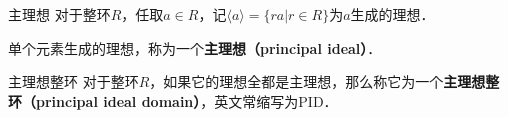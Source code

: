 
\begin{definition}{主理想}
对于整环$R$，任取$a\in R$，记$\langle a \rangle=\{ra|r\in R\}$为$a$生成的理想．

单个元素生成的理想，称为一个\textbf{主理想（principal ideal）}．
\end{definition}

\begin{definition}{主理想整环}
对于整环$R$，如果它的理想全都是主理想，那么称它为一个\textbf{主理想整环（principal ideal domain）}，英文常缩写为PID．
\end{definition}

